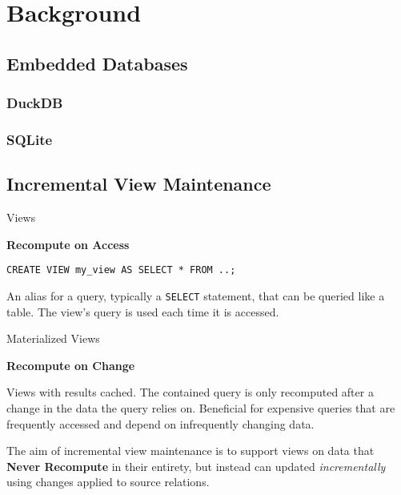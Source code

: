 \chapter{Background}

\section{Embedded Databases}
\subsection{DuckDB}

\subsection{SQLite}

\section{Incremental View Maintenance}

\begin{tcbraster}[raster columns=2,raster equal height]
    \begin{definitionbox}{Views}
        \centerline{\textbf{Recompute on Access}}
        \begin{verbatim}
CREATE VIEW my_view AS SELECT * FROM ..;            
        \end{verbatim}
        An alias for a query, typically a \texttt{SELECT} statement, that can be queried like a table. The view's query is used each time it is accessed.\cite{Postgres16Docs}
    \end{definitionbox}
    \begin{definitionbox}{Materialized Views}
        \centerline{\textbf{Recompute on Change}}
        Views with results cached. The contained query is only recomputed after a change in the data the query relies on. Beneficial for expensive queries that are frequently accessed and depend on infrequently changing data.
    \end{definitionbox}
\end{tcbraster}
\noindent
The aim of incremental view maintenance is to support views on data that \textbf{Never Recompute} in their entirety, but instead can updated \textit{incrementally} using changes applied to source relations.
\\
